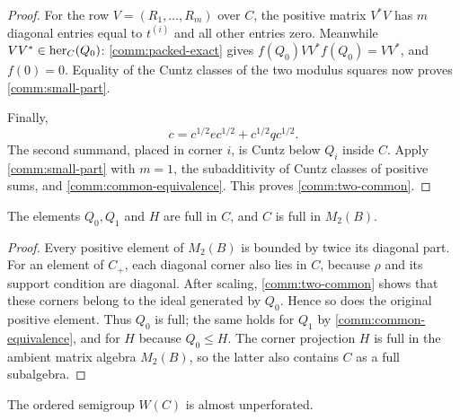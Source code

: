 \begin{proof}
For the row $V=(R_1,\ldots,R_m)$ over $C$, the positive matrix
$V^*V$ has $m$ diagonal entries equal to $t^{(i)}$ and all
other entries zero.  Meanwhile $VV^*\in\operatorname{her}_C(Q_0)$:
\eqref{comm:packed-exact} gives
$f(Q_0)VV^*f(Q_0)=VV^*$, and $f(0)=0$.
Equality of the Cuntz classes of the two modulus squares now proves
\eqref{comm:small-part}.

Finally,
\[
 c=c^{1/2}ec^{1/2}+c^{1/2}qc^{1/2}.
\]
The second summand, placed in corner $i$, is Cuntz below $Q_i$
inside $C$.  Apply \eqref{comm:small-part} with $m=1$, the
subadditivity of Cuntz classes of positive sums, and
\eqref{comm:common-equivalence}.  This proves
\eqref{comm:two-common}.
\end{proof}

\begin{corollary}\label{comm:fullness}
The elements $Q_0,Q_1$ and $H$ are full in $C$, and $C$ is full
in $M_2(B)$.
\end{corollary}

\begin{proof}
Every positive element of $M_2(B)$ is bounded by twice its diagonal
part.  For an element of $C_+$, each diagonal corner also lies in
$C$, because $\rho$ and its support condition are diagonal.
After scaling, \eqref{comm:two-common} shows that these corners
belong to the ideal generated by $Q_0$.  Hence so does the original
positive element.  Thus $Q_0$ is full; the same holds for $Q_1$ by
\eqref{comm:common-equivalence}, and for $H$ because $Q_0\leq H$.
The corner projection $H$ is full in the ambient matrix algebra
$M_2(B)$, so the latter also contains $C$ as a full subalgebra.
\end{proof}

\begin{proposition}\label{comm:unperforated}
The ordered semigroup $W(C)$ is almost unperforated.
\end{proposition}

